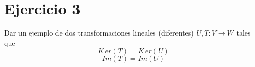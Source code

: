 \section*{Ejercicio 3}

Dar un ejemplo de dos transformaciones lineales (diferentes) $U,T : V \rightarrow W$ tales que
$$ K\,er(T) = K\,er(U) $$
$$ Im(T) = Im(U) $$